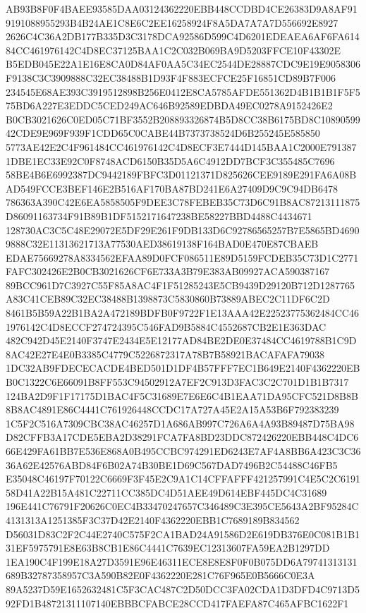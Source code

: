 \documentclass[UTF8,fontset=fandol,zihao=-4,a4paper]{ctexart}
\begin{document}
{{AB93B8F0F4BAEE93585DAA03124362220EBB448CCDBD4CE26383D9A8AF919191088955293B4B24AE1C8E6C2EE16258924F8A5DA7A7A7D556692E8927
2626C4C36A2DB177B335D3C3178DCA92586D599C4D6201EDEAEA6AF6FA61484CC461976142C4D8EC37125BAA1C2C032B069BA9D5203FFCE10F43302E
B5EDB045E22A1E16E8CA0D84AF0AA5C34EC2544DE28887CDC9E19E9058306F9138C3C3909888C32EC38488B1D93F4F883ECFCE25F16851CD89B7F006
234545E68AE393C3919512898B256E0412E8CA5785AFDE551362D4B1B1B1F5F575BD6A227E3EDDC5CED249AC646B92589EDBDA49EC0278A9152426E2
B0CB3021626C0ED05C71BF3552B208893326874B5D8CC38B6175BD8C1089059942CDE9E969F939F1CDD65C0CABE44B7373738524D6B255245E585850
5773AE42E2C4F961484CC461976142C4D8ECF3E7444D145BAA1C2000E7913871DBE1EC33E92C0F8748ACD6150B35D5A6C4912DD7BCF3C355485C7696
58BE4B6E6992387DC9442189FBFC3D01121371D825626CEE9189E291FA6A08BAD549FCCE3BEF146E2B516AF170BA87BD241E6A27409D9C9C94DB6478
786363A390C42E6EA5858505F9DEE3C78FEBEB35C73D6C91B8AC87213111875D86091163734F91B89B1DF5152171647238BE58227BBD4488C4434671
128730AC3C5C48E29072E5DF29E261F9DB133D6C92786565257B7E5865BD46909888C32E11313621713A77530AED38619138F164BAD0E470E87CBAEB
EDAE75669278A8334562EFAA89D0FCF086511E89D5159FCDEB35C73D1C2771FAFC302426E2B0CB3021626CF6E733A3B79E383AB09927ACA590387167
89BCC961D7C3927C55F85A8AC4F1F51285243E5CB9439D29120B712D1287765A83C41CEB89C32EC38488B1398873C5830860B73889ABEC2C11DF6C2D
8461B5B59A22B1BA2A472189BDFB0F9722F1E13AAA42E22523775362484CC461976142C4D8ECCF274724395C546FAD9B5884C4552687CB2E1E363DAC
482C942D45E2140F3747E2434E5E12177AD84BE2DE0E37484CC4619788B1C9D8AC42E27E4E0B3385C4779C5226872317A78B7B58921BACAFAFA79038
1DC32AB9FDECECACDE4BED501D1DF4B57FFF7EC1B649E2140F4362220EBB0C1322C6E66091B8FF553C94502912A7EF2C913D3FAC3C2C701D1B1B7317
124BA2D9F1F17175D1BAC4F5C31689E7E6E6C4B1EAA71DA95CFC521D8B8B8B8AC4891E86C4441C761926448CCDC17A727A45E2A15A53B6F792383239
1C5F2C516A7309CBC38AC46257D1A686AB997C726A6A4A93B89487D75BA98D82CFFB3A17CDE5EBA2D38291FCA7FA8BD23DDC872426220EBB448C4DC6
66E429FA61BB7E536E868A0B495CCBC974291ED6243E7AF4A8BB6A423C3C3636A62E42576ABD84F6B02A74B30BE1D69C567DAD7496B2C54488C46FB5
E35048C46197F70122C6669F3F45E2C9A1C14CFFAFFF421257991C4E5C2C619158D41A22B15A481C22711CC385DC4D51AEE49D614EBF445DC4C31689
196E441C76791F20626C0EC4B33470247657C346489C3E395CE5643A2BF95284C4131313A1251385F3C37D42E2140F4362220EBB1C7689189B834562
D56031D83C2F2C44E2740C575F2CA1BAD24A91586D2E619DB376E0C081B1B131EF5975791E8E63B8CB1E86C4441C7639EC12313607FA59EA2B1297DD
1EA190C4F199E18A27D3591E96E46311ECE8E8E8F0F0B075DD6A79741313131689B32787358957C3A590B82E0F4362220E281C76F965E0B5666C0E3A
89A5237D59E1652632481C5F3CAC487C2D50DCC3FA02CDA1D3DFD4C9713D592FD1B48721311107140EBBBCFABCE28CCD417FAEFA87C465AFBC1622F1
}}
\end{document}
